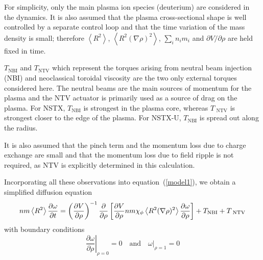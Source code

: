 \documentclass[12pt,lot, lof]{puthesis}
\begin{document}
For simplicity, only the main plasma ion species (deuterium) are considered in the dynamics.
It is also assumed that the plasma cross-sectional shape is well controlled by a separate control loop and that the time variation of the mass density is small; therefore $\left< R^2 \right>$, $\left< R^2  (\nabla\rho)^2 \right>$, $ \sum_i n_i m_i $ and $\partial V/\partial \rho$ are held fixed in time.

$T_\text{NBI} $ and $T_\text{NTV}$ which represent the torques arising from neutral beam injection (NBI) and neoclassical toroidal viscosity are the two only external torques considered here.
The neutral beams are the main sources of momentum for the plasma and the NTV actuator is primarily used as a source of drag on the plasma. For NSTX, $T_\text{NBI}$ is strongest  in the plasma core, whereas $T_\text{ NTV}$ is strongest closer to the edge of the plasma. 
For NSTX-U, $T_\text{NBI}$ is spread out along the radius.

 It is also assumed that the pinch term and  the momentum loss due to charge exchange are small \cite{Solomon08, Kaye09} and that the momentum loss due to  field ripple is not required, as NTV is explicitly determined in this calculation.

Incorporating all these observations into equation~(\ref{model1}), we obtain a simplified diffusion equation
\begin{equation}
 n m \left<R^2\right>
 \frac{\partial \omega}{\partial t} 
 = \left( \frac{\partial V}{\partial\rho}\right)^{-1}
   \frac{\partial}{\partial \rho} 
   \left[\frac{\partial V}{\partial \rho} n m \chi_\phi 
   \left< R^2 (\nabla \rho)^2\right> 
   \frac{\partial\omega}{\partial\rho}\right] 
   \hfill + T_\text{NBI} + T_\text{ NTV}
\label{model2}
\end{equation}
with boundary conditions
\begin{equation}
\left.\frac{\partial\omega}{\partial\rho}\right|_{\rho=0} = 0 
\quad \text{and} \quad 
\left.\omega\right|_{\rho=1} = 0
\label{model3}
\end{equation}
\end{document}
